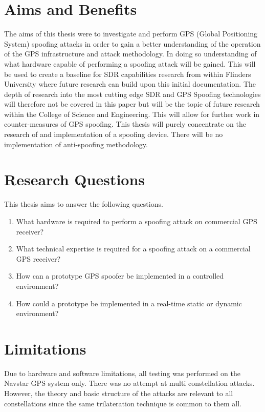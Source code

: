 \section{Aims and Benefits}\label{sec:Aims}
The aims of this thesis were to investigate and perform GPS (Global Positioning System) spoofing attacks in order to gain a better understanding of the operation of the GPS infrastructure and attack
methodology. In doing so understanding of what hardware capable of performing a spoofing attack will be gained. This will be used to create a baseline for SDR capabilities research from within Flinders University where future research can build upon this initial documentation.
The depth of research into the most cutting edge SDR and GPS Spoofing technologies will therefore not be covered in this paper but will be the topic of future research
within the College of Science and Engineering. This will
allow for further work in counter-measures of GPS spoofing.
This thesis will purely concentrate on the research of and implementation of a spoofing device. There will be no implementation of anti-spoofing methodology.

\section{Research Questions}\label{sec:RQs}
This thesis aims to answer the following questions.
\begin{enumerate}
    \item What hardware is required to perform a spoofing attack on commercial GPS receiver?
    \item What technical expertise is required for a spoofing attack on a commercial GPS receiver?
    \item How can a prototype GPS spoofer be implemented in a controlled environment?
    \item How could a prototype be implemented in a real-time static or dynamic environment? 
\end{enumerate}

\section{Limitations}\label{sec:Limits}
Due to hardware and software limitations, all testing was performed on the Navstar GPS system only. There was no attempt at multi constellation attacks. However, the theory and basic
structure of the attacks are relevant to all constellations since the same trilateration technique is common to them all.

